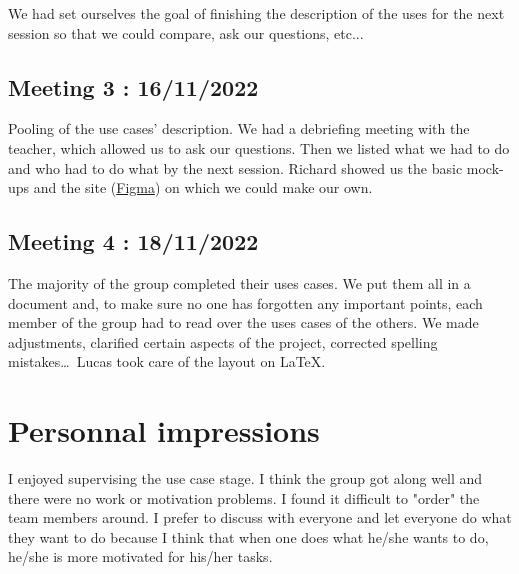 We had set ourselves the goal of finishing the description of the uses for the next session so that we could compare, ask our questions, etc...

\section{Meeting 3 : 16/11/2022}
Pooling of the use cases' description. We had a debriefing meeting with the teacher, which allowed us to ask our questions. Then we listed what we had to do and who had to do what by the next session. Richard showed us the basic mock-ups and the site (\href{https://www.figma.com}{Figma}) on which we could make our own.

\section{Meeting 4 : 18/11/2022}
The majority of the group completed their uses cases. We put them all in a document and, to make sure no one has forgotten any important points, each member of the group had to read over the uses cases of the others. We made adjustments, clarified certain aspects of the project, corrected spelling mistakes\dots\ Lucas took care of the layout on \LaTeX.

\chapter{Personnal impressions}
I enjoyed supervising the use case stage. I think the group got along well and there were no work or motivation problems. I found it difficult to "order" the team members around. I prefer to discuss with everyone and let everyone do what they want to do because I think that when one does what he/she wants to do, he/she is more motivated for his/her tasks.